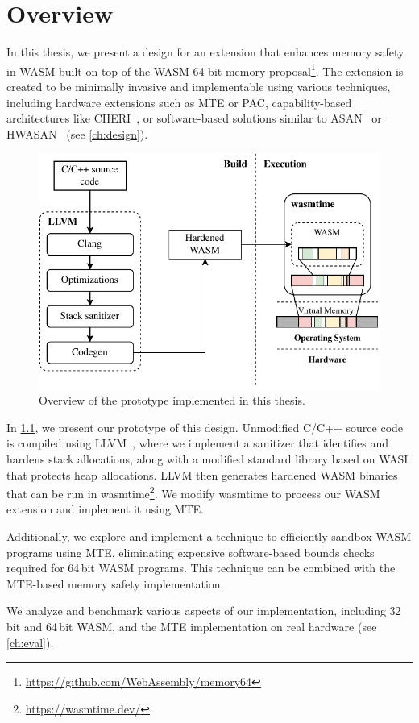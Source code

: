 \chapter{Overview}
\label{ch:overview}

In this thesis, we present a design for an extension that enhances memory safety in \ac{WASM} built on top of the \ac{WASM} 64-bit memory proposal\footnote{\url{https://github.com/WebAssembly/memory64}}.
The extension is created to be minimally invasive and implementable using various techniques, including hardware extensions such as \ac{MTE} or \ac{PAC}, capability-based architectures like \ac{CHERI}~\cite{woodruff2014cheri}, or software-based solutions similar to \ac{ASAN}~\cite{serebryany2012addresssanitizer} or \ac{HWASAN}~\cite{serebryany2018memory} (see \cref{ch:design}).


\begin{figure}[ht]
    \centering
    \includegraphics{figures/build/overview-simple}
    \caption{Overview of the prototype implemented in this thesis.}
    \label{fig:system-overview}
\end{figure}

In \cref{fig:system-overview}, we present our prototype of this design.
Unmodified C/C++ source code is compiled using LLVM~\cite{lattner2004llvm}, where we implement a sanitizer that identifies and hardens stack allocations, along with a modified standard library based on \ac{WASI} that protects heap allocations.
LLVM then generates hardened \ac{WASM} binaries that can be run in wasmtime\footnote{\url{https://wasmtime.dev/}}.
We modify wasmtime to process our \ac{WASM} extension and implement it using \ac{MTE}.

Additionally, we explore and implement a technique to efficiently sandbox \ac{WASM} programs using \ac{MTE}, eliminating expensive software-based bounds checks required for 64\,bit \ac{WASM} programs.
This technique can be combined with the \ac{MTE}-based memory safety implementation.

We analyze and benchmark various aspects of our implementation, including 32\,bit and 64\,bit \ac{WASM}, and the \ac{MTE} implementation on real hardware (see \cref{ch:eval}).

